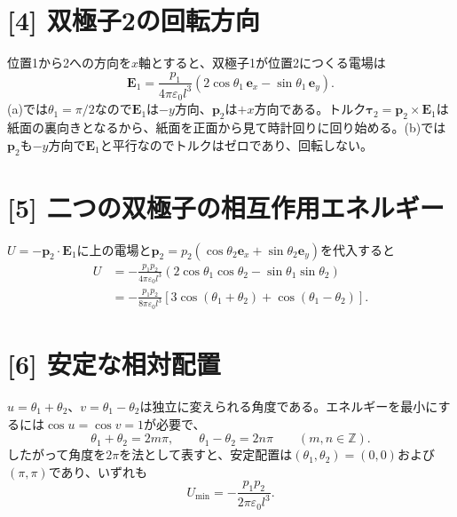 \documentclass[11pt,a4paper]{article}
\begin{document}
\section*{[4] 双極子2の回転方向}
位置1から2への方向を$x$軸とすると、双極子1が位置2につくる電場は
\begin{equation}
  \boldsymbol E_1=\frac{p_1}{4\pi\varepsilon_0l^3}
    (2\cos\theta_1\,\boldsymbol e_x-\sin\theta_1\,\boldsymbol e_y).
\end{equation}
(a)では$\theta_1=\pi/2$なので$\boldsymbol E_1$は$-y$方向、$\boldsymbol p_2$は$+x$方向である。トルク$\boldsymbol\tau_2=\boldsymbol p_2\times\boldsymbol E_1$は紙面の裏向きとなるから、紙面を正面から見て時計回りに回り始める。(b)では$\boldsymbol p_2$も$-y$方向で$\boldsymbol E_1$と平行なのでトルクはゼロであり、回転しない。

\section*{[5] 二つの双極子の相互作用エネルギー}
$U=-\boldsymbol p_2\cdot\boldsymbol E_1$に上の電場と$\boldsymbol p_2=p_2(\cos\theta_2\boldsymbol e_x+\sin\theta_2\boldsymbol e_y)$を代入すると
\begin{align}
  U&=-\frac{p_1p_2}{4\pi\varepsilon_0l^3}
       (2\cos\theta_1\cos\theta_2-\sin\theta_1\sin\theta_2)\\
   &=-\frac{p_1p_2}{8\pi\varepsilon_0l^3}
       [3\cos(\theta_1+\theta_2)+\cos(\theta_1-\theta_2)].
\end{align}

\section*{[6] 安定な相対配置}
$u=\theta_1+\theta_2$、$v=\theta_1-\theta_2$は独立に変えられる角度である。エネルギーを最小にするには$\cos u=\cos v=1$が必要で、
\begin{equation}
  \theta_1+\theta_2=2m\pi,\qquad
  \theta_1-\theta_2=2n\pi\qquad(m,n\in\mathbb Z).
\end{equation}
したがって角度を$2\pi$を法として表すと、安定配置は$(\theta_1,\theta_2)=(0,0)$および$(\pi,\pi)$であり、いずれも
\begin{equation}
  \boxed{U_{\min}=-\frac{p_1p_2}{2\pi\varepsilon_0l^3}}.
\end{equation}
\end{document}
